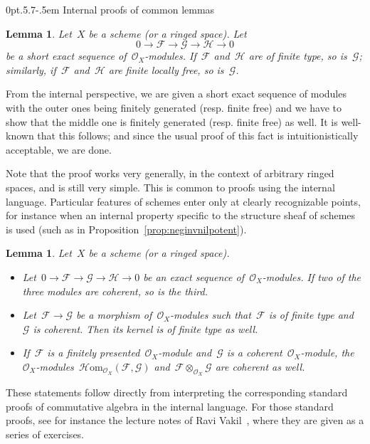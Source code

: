 \documentclass[10pt,reqno,a4paper]{amsbook}
\makeatletter
\theoremstyle{definition}
\theoremstyle{plain}
\newtheorem{lemma}[defn]{Lemma}
\theoremstyle{remark}
\newcommand{\F}{\mathcal{F}}
\renewcommand{\G}{\mathcal{G}}
\renewcommand{\H}{\mathcal{H}}
\renewcommand{\O}{\mathcal{O}}
\newcommand{\HOM}{\mathcal{H}\mathrm{om}}
\newcommand{\?}{\,{:}\,}
\renewcommand{\_}{\mathpunct{.}\,}
\newcommand{\lra}{\longrightarrow}
\newcommand{\resp}{resp.\@\xspace}
\renewenvironment{proof}[1][\proofname]{\par
  \pushQED{\qed}%
  \normalfont \topsep6\p@\@plus6\p@\relax
  \trivlist
  \item[\hskip\labelsep
        \itshape
    #1\@addpunct{.}]\ignorespaces
}{%
  \popQED\endtrivlist\@endpefalse
}
\def\subsection{\@startsection{subsection}{2}%
  {0pt}{.5\linespacing\@plus.7\linespacing}{-.5em}%
  {\normalfont\bfseries}}
\makeatother
\begin{document}
\subsection{Internal proofs of common lemmas}

\begin{lemma}Let~$X$ be a scheme (or a ringed space). Let
\[ 0 \lra \F \lra \G \lra \H \lra 0 \]
be a short exact sequence of~$\O_X$-modules. If~$\F$ and~$\H$ are of finite
type, so is~$\G$; similarly, if~$\F$ and~$\H$ are finite locally free, so
is~$\G$.
\end{lemma}
\begin{proof}From the internal perspective, we are given a short exact sequence
of modules with the outer ones being finitely generated (\resp finite free)
and we have to show that the middle one is finitely generated (\resp finite
free) as well. It is well-known that this follows; and since the usual proof of
this fact is intuitionistically acceptable, we are done.
\end{proof}

Note that the proof works very generally, in the context of arbitrary ringed
spaces, and is still very simple. This is common to proofs using the internal
language. Particular features of schemes enter only at clearly recognizable
points, for instance when an internal property specific to the structure sheaf
of schemes is used (such as in Proposition~\ref{prop:neginvnilpotent}).

\begin{lemma}\label{lemma:coherent-stuff}
Let~$X$ be a scheme (or a ringed space).
\begin{itemize}
\item Let~$0 \to \F \to \G \to \H \to 0$ be an exact sequence
of~$\O_X$-modules. If two of the three modules are coherent, so is the third.
\item Let~$\F \to \G$ be a morphism of~$\O_X$-modules such that~$\F$ is
of finite type and~$\G$ is coherent. Then its kernel is of finite type as well.
\item If~$\F$ is a finitely presented~$\O_X$-module and~$\G$ is a
coherent~$\O_X$-module, the~$\O_X$-modules~$\HOM_{\O_X}(\F,\G)$ and~$\F \otimes_{\O_X} \G$
are coherent as well.
\end{itemize}
\end{lemma}
\begin{proof}These statements follow directly from interpreting the
corresponding standard proofs of commutative algebra in the internal language.
For those standard proofs, see for instance the lecture notes of Ravi
Vakil~\cite[Section~13.8]{vakil:foag}, where they are given as a series of
exercises.
\end{proof}
\end{document}
